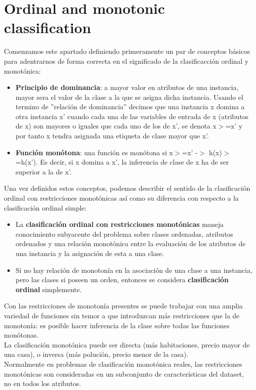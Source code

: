 \section{Ordinal and monotonic classification}

Comenzamos este apartado definiendo primeramente un par de conceptos básicos para adentrarnos de forma correcta en el significado
de la clasificacción ordinal y monotónica:

\begin{itemize}
	\item \textbf{Principio de dominancia}: a mayor valor en atributos de una instancia, mayor sera el
	valor de la clase a la que se asigna dicha instancia.
	Usando el termino de ''relación de dominancia'' decimos que una instancia x domina a
	otra instancia x' cuando cada una de las variables de entrada de x (atributos de x)
	son mayores o iguales que cada uno de los de x', se denota x$>$=x' y por tanto
	x tendra asignada una etiqueta de clase mayor que x'.
	\item \textbf{Función monótona}: una función es monótona si x$>$=x' -$>$ h(x)$>$=h(x'). Es decir, si x domina a x', la
	inferencia de clase de x ha de ser superior a la de x'.
\end{itemize}

Una vez definidos estos conceptos, podemos describir el sentido de la clasificación ordinal con restricciones monotónicas así como su diferencia con respecto a la clasificación ordinal simple:

\begin{itemize}
	\item La \textbf{clasificación ordinal con restricciones monotónicas} maneja conocimiento subyacente del
	problema sobre clases ordenadas, atributos ordenados y una relación monotónica entre
	la evaluación de los atributos de una instancia y la asignación de esta a una clase.
	\item Si no hay relación de monotonía en la asociación de una clase a una instancia, 
	pero las clases si poseen un orden, entonces se considera\textbf{ clasificación ordinal} simplemente.
\end{itemize}

Con las restricciones de monotonía presentes se puede trabajar con una amplia
variedad de funciones sin temor a que introduzcan más restricciones que 
la de monotonía: es posible hacer inferencia de la clase sobre todas las funciones
monótonas.\\
La clasificación monotónica puede ser directa (más habitaciones, precio mayor
de una casa), o inversa (más polución, precio menor de la casa).\\
Normalmente en problemas de clasificación monotónica reales, las restricciones
monotónicas son consideradas en un subconjunto de características del dataset, no en todos los atributos.

